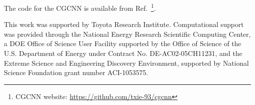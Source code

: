 \documentclass[twocolumn, prl]{revtex4-1}
\begin{document}
The code for the CGCNN is available from Ref.~\footnote{CGCNN website: \href{https://github.com/txie-93/cgcnn}{https://github.com/txie-93/cgcnn}}.

\begin{acknowledgements}
This work was supported by Toyota Research Institute. Computational support was provided through the National Energy Research Scientific Computing Center, a DOE Office of Science User Facility supported by the Office of Science of the U.S. Department of Energy under Contract No. DE-AC02-05CH11231, and the Extreme Science and Engineering Discovery Environment, supported by National Science Foundation grant number ACI-1053575.
\end{acknowledgements}






%


\end{document}
